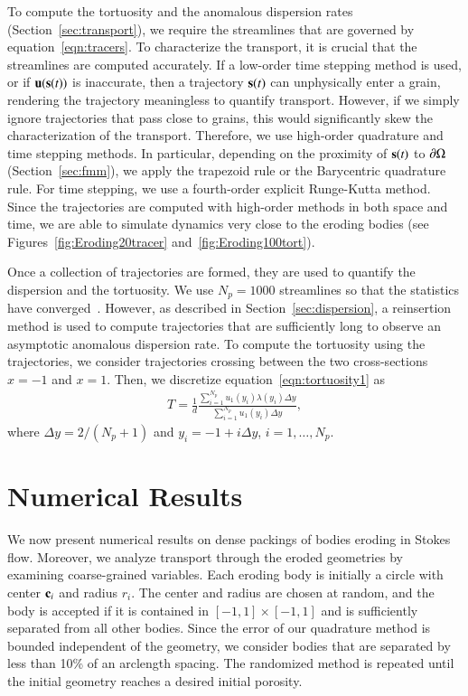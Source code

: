 \documentclass[preprint,10pt]{elsarticle}
\begin{document}
To compute the tortuosity and the anomalous dispersion rates
(Section~\ref{sec:transport}), we require the streamlines that are
governed by equation~\eqref{eqn:tracers}.  To characterize the
transport, it is crucial that the streamlines are computed accurately.
If a low-order time stepping method is used, or if $\uu(\ss(t))$ is
inaccurate, then a trajectory $\ss(t)$ can unphysically enter a grain,
rendering the trajectory meaningless to quantify transport.  However, if
we simply ignore trajectories that pass close to grains, this would
significantly skew the characterization of the transport. Therefore, we
use high-order quadrature and time stepping methods.  In particular,
depending on the proximity of $\ss(t)$ to $\bd\Omega$
(Section~\ref{sec:fmm}), we apply the trapezoid rule or the Barycentric
quadrature rule.  For time stepping, we use a fourth-order explicit
Runge-Kutta method.  Since the trajectories are computed with high-order
methods in both space and time,  we are able to simulate dynamics very
close to the eroding bodies (see Figures~\ref{fig:Eroding20tracer}
and~\ref{fig:Eroding100tort}).

Once a collection of trajectories are formed, they are used to quantify
the dispersion and the tortuosity.  We use $N_p = 1000$ streamlines so
that the statistics have converged~\cite{bel-sal-rin1992}.  However, as
described in Section~\ref{sec:dispersion}, a reinsertion method is used
to compute trajectories that are sufficiently long to observe an
asymptotic anomalous dispersion rate.  To compute the tortuosity using
the trajectories, we consider trajectories crossing between the two
cross-sections $x=-1$ and $x=1$.  Then, we discretize
equation~\eqref{eqn:tortuosity1} as
\begin{align}
  T = \frac{1}{d}\frac{\displaystyle\sum_{i=1}^{N_p} 
    u_1(y_i) \lambda(y_i) \Delta y}
  {\displaystyle\sum_{i=1}^{N_p} u_1(y_i) \Delta y}, 
\end{align}
where $\Delta y = 2/(N_p + 1)$ and $y_i = -1 + i \Delta y$,
$i=1,\ldots,N_p$.  

\section{Numerical Results}
\label{sec:results}
We now present numerical results on dense packings of bodies eroding in
Stokes flow. Moreover, we analyze transport through the eroded
geometries by examining coarse-grained variables.  Each eroding body is
initially a circle with center $\cc_i$ and radius $r_i$.  The center and
radius are chosen at random, and the body is accepted if it is contained
in $[-1,1] \times [-1,1]$ and is sufficiently separated from all other
bodies.  Since the error of our quadrature method is bounded independent
of the geometry, we consider bodies that are separated by less than 10\%
of an arclength spacing.  The randomized method is repeated until the
initial geometry reaches a desired initial porosity.
\end{document}
